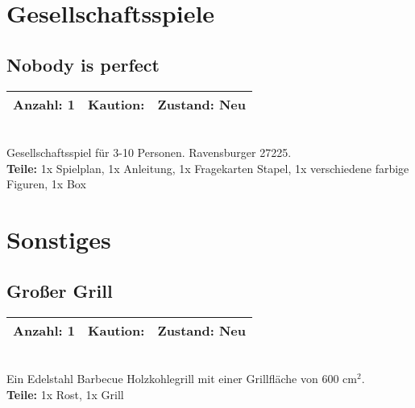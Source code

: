 \documentclass[a4paper]{article}
\newcommand{\infobox}[3] %
        {\par
                \begin{tabular}{| c | c | c| }
                \hline
                Anzahl: #1 & Kaution: \EUR{#2} & Zustand: #3 \\
                \hline
                \end{tabular} \\
        }
\begin{document}




\section{Gesellschaftsspiele}

\subsection{Nobody is perfect}
\infobox{1}{0}{Neu}
Gesellschaftsspiel für 3-10 Personen. Ravensburger 27225. \\
\textbf{Teile:} 1x Spielplan, 1x Anleitung, 1x Fragekarten Stapel, 1x verschiedene farbige Figuren, 1x Box


\section{Sonstiges}

\subsection{Großer Grill}
\infobox{1}{10}{Neu}
Ein Edelstahl Barbecue Holzkohlegrill mit einer Grillfläche von 600 cm$^2$. \\
\textbf{Teile:} 1x Rost, 1x Grill

\end{document}

